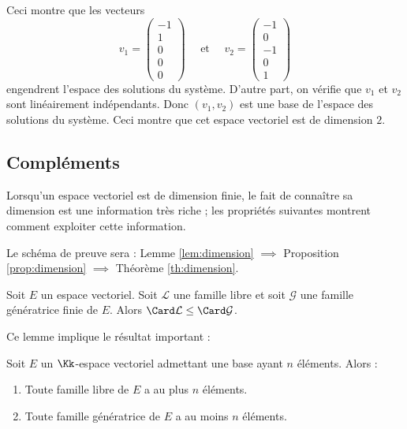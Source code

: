 \documentclass[class=report,crop=false]{standalone}
\begin{document}
\begin{exemple}
Ceci montre que les vecteurs
$$ v_1 = \left( \begin{smallmatrix} -1\\1\\0\\0\\0\end{smallmatrix}\right)
\quad \text{ et } \quad
v_2 =  \left( \begin{smallmatrix} -1\\0\\-1\\0\\1\end{smallmatrix}\right)$$
engendrent l'espace des solutions du système.
D'autre part, on vérifie que $v_1$ et $v_2$ sont linéairement indépendants.
Donc $(v_1, v_2)$ est une base de l'espace des solutions du système.
Ceci montre que cet espace vectoriel est de dimension $2$.
\end{exemple}


\subsection{Compléments}

Lorsqu'un espace vectoriel est de dimension finie,
le fait de connaître sa dimension est une information très riche ;
les propriétés suivantes montrent comment exploiter cette information.

Le schéma de preuve sera :
Lemme \ref{lem:dimension} $\implies$
Proposition \ref{prop:dimension} $\implies$
Théorème \ref{th:dimension}.

\begin{lemme}
\label{lem:dimension}
Soit $E$ un espace vectoriel.
Soit $\mathcal{L}$ une famille libre et soit
$\mathcal{G}$ une famille génératrice finie de $E$.
Alors $\Card \mathcal{L} \le \Card \mathcal{G}$.
\end{lemme}

\bigskip

Ce lemme implique le résultat important :
\begin{proposition}
\label{prop:dimension}
Soit $E$ un $\Kk$-espace vectoriel admettant une base ayant $n$ éléments. Alors :
\begin{enumerate}
  \item Toute famille libre de $E$ a au plus $n$ éléments.

  \item Toute famille génératrice de $E$ a au moins $n$ éléments.
\end{enumerate}
\end{proposition}
\end{document}
